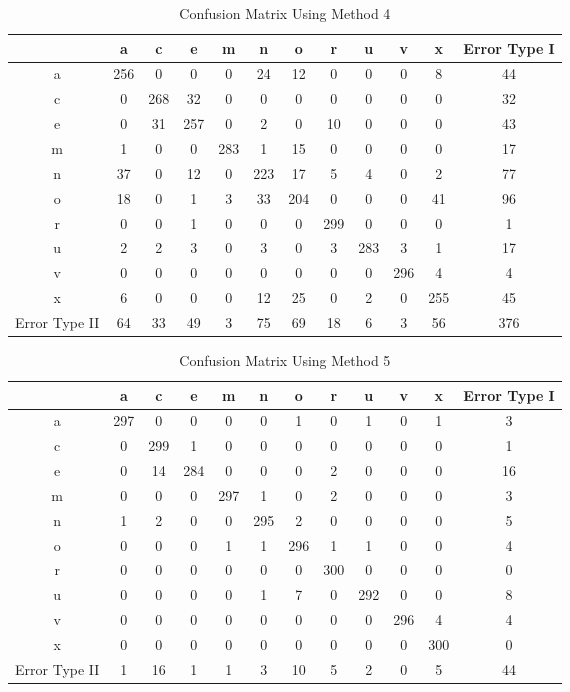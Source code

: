 \documentclass[12pt]{article}
\begin{document}
\begin{table*}
    \centering
    \caption{Confusion Matrix Using Method 4}
    \begin{tabular}{| c | c | c | c | c | c | c | c | c | c | c | c |} \hline
        & a & c & e & m & n & o & r & u & v & x & Error Type I\\ \hline
      a & 256 & 0 & 0 & 0 & 24 & 12 & 0 & 0 & 0 & 8 & 44\\ \hline
      c & 0 & 268 & 32 & 0 & 0 & 0 & 0 & 0 & 0 & 0 & 32\\ \hline
      e & 0 & 31 & 257 & 0 & 2 & 0 & 10 & 0 & 0 & 0 & 43\\ \hline
      m & 1 & 0 & 0 & 283 & 1 & 15 & 0 & 0 & 0 & 0 & 17\\ \hline
      n & 37 & 0 & 12 & 0 & 223 & 17 & 5 & 4 & 0 & 2 & 77\\ \hline
      o & 18 & 0 & 1 & 3 & 33 & 204 & 0 & 0 & 0 & 41 & 96\\ \hline
      r & 0 & 0 & 1 & 0 & 0 & 0 & 299 & 0 & 0 & 0 & 1\\ \hline
      u & 2 & 2 & 3 & 0 & 3 & 0 & 3 & 283 & 3 & 1 & 17\\ \hline
      v & 0 & 0 & 0 & 0 & 0 & 0 & 0 & 0 & 296 & 4 & 4\\ \hline
      x & 6 & 0 & 0 & 0 & 12 & 25 & 0 & 2 & 0 & 255 & 45\\ \hline
Error Type II & 64 & 33 & 49 & 3 & 75 & 69 & 18 & 6 & 3 & 56 & 376\\ \hline
    \end{tabular}
\end{table*}

\begin{table*}
    \centering
    \caption{Confusion Matrix Using Method 5}
    \begin{tabular}{| c | c | c | c | c | c | c | c | c | c | c | c |} \hline
        & a & c & e & m & n & o & r & u & v & x & Error Type I\\ \hline
      a & 297 & 0 & 0 & 0 & 0 & 1 & 0 & 1 & 0 & 1 & 3\\ \hline
      c & 0 & 299 & 1 & 0 & 0 & 0 & 0 & 0 & 0 & 0 & 1\\ \hline
      e & 0 & 14 & 284 & 0 & 0 & 0 & 2 & 0 & 0 & 0 & 16\\ \hline
      m & 0 & 0 & 0 & 297 & 1 & 0 & 2 & 0 & 0 & 0 & 3\\ \hline
      n & 1 & 2 & 0 & 0 & 295 & 2 & 0 & 0 & 0 & 0 & 5\\ \hline
      o & 0 & 0 & 0 & 1 & 1 & 296 & 1 & 1 & 0 & 0 & 4\\ \hline
      r & 0 & 0 & 0 & 0 & 0 & 0 & 300 & 0 & 0 & 0 & 0\\ \hline
      u & 0 & 0 & 0 & 0 & 1 & 7 & 0 & 292 & 0 & 0 & 8\\ \hline
      v & 0 & 0 & 0 & 0 & 0 & 0 & 0 & 0 & 296 & 4 & 4\\ \hline
      x & 0 & 0 & 0 & 0 & 0 & 0 & 0 & 0 & 0 & 300 & 0\\ \hline
Error Type II & 1 & 16 & 1 & 1 & 3 & 10 & 5 & 2 & 0 & 5 & 44\\ \hline
    \end{tabular}
\end{table*}
\end{document}

